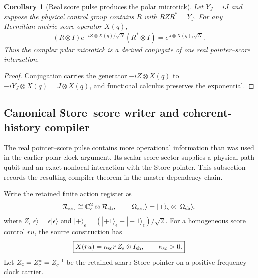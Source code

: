 \documentclass[11pt]{article}
\newtheorem{corollary}[theorem]{Corollary}
\theoremstyle{definition}
\theoremstyle{remark}
\newcommand{\C}{\mathbb C}
\begin{document}
\begin{corollary}[Real score pulse produces the polar microtick]
\label{cor:real-score-polar-master}
Let $Y_J=iJ$ and suppose the physical control group contains $R$ with
$RZR^*=Y_J$.  For any Hermitian metric-score operator $X(q)$,
\[
 \boxed{
 (R\otimes I)e^{-iZ\otimes X(q)/\sqrt N}(R^*\otimes I)
 =e^{J\otimes X(q)/\sqrt N}.}
\]
Thus the complex polar microtick is a derived conjugate of one real
pointer--score interaction.
\end{corollary}

\begin{proof}
Conjugation carries the generator $-iZ\otimes X(q)$ to
$-iY_J\otimes X(q)=J\otimes X(q)$, and functional calculus preserves the
exponential.
\end{proof}

\subsection{Canonical Store--score writer and coherent-history compiler}
\label{sec:canonical-store-score-compiler-master}

The real pointer--score pulse contains more operational information than was
used in the earlier polar-clock argument.  Its scalar score sector supplies a
physical path qubit and an exact nonlocal interaction with the Store pointer.
This subsection records the resulting compiler theorem in the master
dependency chain.

Write the retained finite action register as
\[
 \mathcal R_{\rm act}
 \cong \C^2_{\epsilon}\otimes\mathcal R_{\rm sh},
 \qquad
 |\Omega_{\rm act}\rangle
 =|+\rangle_{\epsilon}\otimes|\Omega_{\rm sh}\rangle,
\]
where $Z_{\epsilon}|\epsilon\rangle=\epsilon|\epsilon\rangle$ and
$|+\rangle_{\epsilon}
=(|+1\rangle_{\epsilon}+|-1\rangle_{\epsilon})/\sqrt2$.
For a homogeneous score control $ru$, the source construction has
\begin{equation}
 \boxed{
 X(ru)=\kappa_{\rm sc}r\,Z_{\epsilon}\otimes I_{\rm sh},
 \qquad \kappa_{\rm sc}>0.}
 \label{eq:scalar-score-path-master}
\end{equation}
Let $Z_{\rm c}=Z_{\rm c}^*=Z_{\rm c}^{-1}$ be the retained sharp Store
pointer on a positive-frequency clock carrier.
\end{document}

